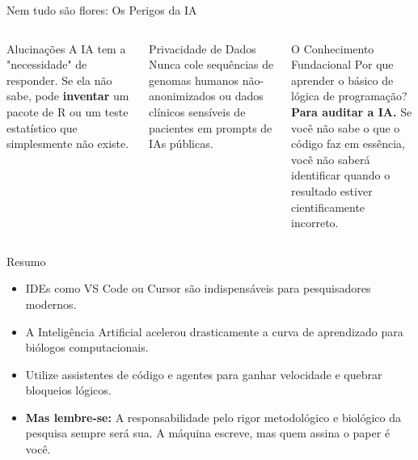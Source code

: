 \begin{frame}{Nem tudo são flores: Os Perigos da IA}
\begin{columns}
\begin{alertblock}{Alucinações}
A IA tem a "necessidade" de responder. Se ela não sabe, pode \textbf{inventar} um pacote de R ou um teste estatístico que simplesmente não existe.
\end{alertblock}

\vspace{0.2cm}
\begin{block}{Privacidade de Dados}
Nunca cole sequências de genomas humanos não-anonimizados ou dados clínicos sensíveis de pacientes em prompts de IAs públicas.
\end{block}

\begin{exampleblock}{O Conhecimento Fundacional}
Por que aprender o básico de lógica de programação?
\\ \vspace{0.2cm}
\textbf{Para auditar a IA.} Se você não sabe o que o código faz em essência, você não saberá identificar quando o resultado estiver cientificamente incorreto.
\end{exampleblock}
\end{columns}
\end{frame}

\begin{frame}{Resumo}
\begin{itemize}
    \item IDEs como VS Code ou Cursor são indispensáveis para pesquisadores modernos.
    \item A Inteligência Artificial acelerou drasticamente a curva de aprendizado para biólogos computacionais.
    \item Utilize assistentes de código e agentes para ganhar velocidade e quebrar bloqueios lógicos.
    \item \textbf{Mas lembre-se:} A responsabilidade pelo rigor metodológico e biológico da pesquisa sempre será sua. A máquina escreve, mas quem assina o paper é você.
\end{itemize}
\end{frame}


